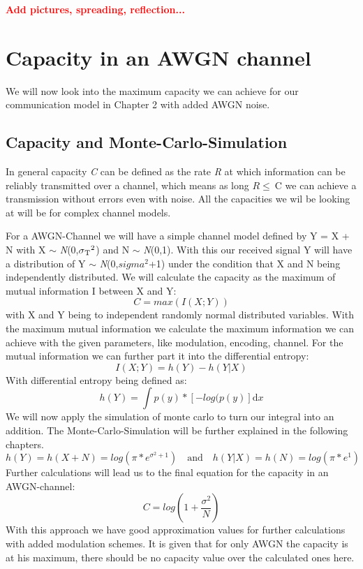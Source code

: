 \documentclass[12pt,oneside, reqno]{report}
\newcommand\boldred[1]{\textcolor{red}{\textbf{#1}}}
\begin{document}
\boldred{Add pictures, spreading, reflection...}
	
\newpage
\chapter{Capacity in an AWGN channel}

We will now look into the maximum capacity we can achieve for our communication model in Chapter 2 with added AWGN noise.

\section{Capacity and Monte-Carlo-Simulation}

In general capacity \textit{C} can be defined as the rate \textit{R} at which information can be reliably transmitted over a channel, which means as long $R \leq \ $C we can achieve a transmission without errors even with noise. All the capacities we wil be looking at will be for complex channel models.

For a AWGN-Channel we will have a simple channel model defined by Y = X + N with X $\sim$ \textit{N}(0,$\sigma\textsubscript{T}^2$) and N $\sim$ \textit{N}(0,1). With this our received signal Y will have a distribution of Y $\sim$ \textit{N}(0,$sigma^2$+1) under the condition that X and N being independently distributed.
We will calculate the capacity as the maximum of mutual information I between X and Y:
\begin{equation}
\label{eq:cap}
C = max(I(X;Y))     
\end{equation}
with X and Y being to independent randomly normal distributed variables.
With the maximum mutual information we calculate the maximum information we can achieve with the given parameters, like modulation, encoding, channel. 
\newline
For the mutual information we can further part it into the differential entropy:
\begin{equation}
I(X;Y) = h(Y) - h(Y|X)
\end{equation}
\newline
With differential entropy being defined as:
\begin{equation}
h(Y) = \int p(y)*[-log(p(y)] \mathrm{d}x
\end{equation}
We will now apply the simulation of monte carlo to turn our integral into an addition. The Monte-Carlo-Simulation will be further explained in the following chapters.
\begin{equation}
h(Y) = h(X+N) = log(\pi*e^{\sigma^2+1}) \quad \textrm{and} \quad h(Y|X) = h(N) = log(\pi*e^{1})
\end{equation}
Further calculations will lead us to the final equation for the capacity in an AWGN-channel:
\begin{equation}
C = log(1+\frac{\sigma^2}{N})
\end{equation}
With this approach we have good approximation values for further calculations with added modulation schemes. It is given that for only AWGN the capacity is at his maximum, there should be no capacity value over the calculated ones here. 
\end{document}

